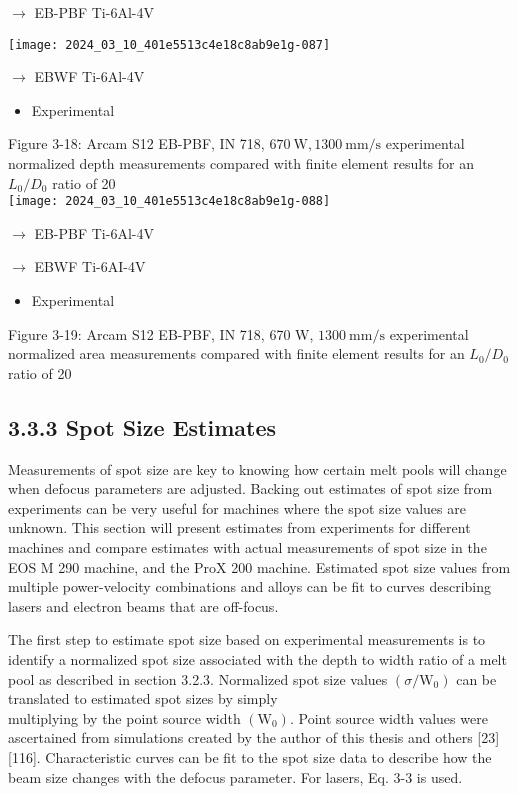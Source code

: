 \documentclass[10pt]{article}
\begin{document}
$\longrightarrow$ EB-PBF Ti-6Al-4V

\begin{center}
\texttt{[image: 2024\_03\_10\_401e5513c4e18c8ab9e1g-087]}
\end{center}

$\longrightarrow$ EBWF Ti-6Al-4V

\begin{itemize}
  \item Experimental
\end{itemize}

Figure 3-18: Arcam S12 EB-PBF, IN 718, $670 \mathrm{~W}, 1300 \mathrm{~mm} / \mathrm{s}$ experimental normalized depth measurements compared with finite element results for an $L_{0} / D_{0}$ ratio of 20\\
\texttt{[image: 2024\_03\_10\_401e5513c4e18c8ab9e1g-088]}

$\longrightarrow$ EB-PBF Ti-6Al-4V

$\longrightarrow$ EBWF Ti-6AI-4V

\begin{itemize}
  \item Experimental
\end{itemize}

Figure 3-19: Arcam S12 EB-PBF, IN 718, 670 W, $1300 \mathrm{~mm} / \mathrm{s}$ experimental normalized area measurements compared with finite element results for an $L_{0} / D_{0}$ ratio of 20

\subsection*{3.3.3 Spot Size Estimates}
Measurements of spot size are key to knowing how certain melt pools will change when defocus parameters are adjusted. Backing out estimates of spot size from experiments can be very useful for machines where the spot size values are unknown. This section will present estimates from experiments for different machines and compare estimates with actual measurements of spot size in the EOS M 290 machine, and the ProX 200 machine. Estimated spot size values from multiple power-velocity combinations and alloys can be fit to curves describing lasers and electron beams that are off-focus.

The first step to estimate spot size based on experimental measurements is to identify a normalized spot size associated with the depth to width ratio of a melt pool as described in section 3.2.3. Normalized spot size values $\left(\sigma / \mathrm{W}_{0}\right)$ can be translated to estimated spot sizes by simply\\
multiplying by the point source width $\left(\mathrm{W}_{0}\right)$. Point source width values were ascertained from simulations created by the author of this thesis and others [23] [116]. Characteristic curves can be fit to the spot size data to describe how the beam size changes with the defocus parameter. For lasers, Eq. 3-3 is used.
\end{document}
